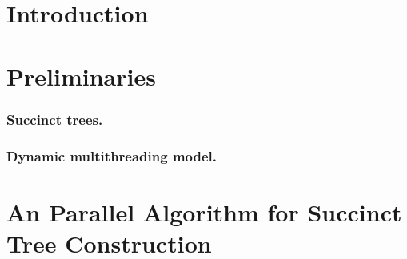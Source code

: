 \documentclass[runningheads]{llncs}
\begin{document}
\section{Introduction}
\label{sec:introduction}




\section{Preliminaries}
\label{sec:relwork}


\subsubsection{Succinct trees.}
\label{subsec:suctrees}


\subsubsection{Dynamic multithreading model.}
\label{subsec:dym}


%


\section{An Parallel Algorithm for Succinct Tree Construction}
\label{sec:multicoreST}



%


\end{document}
